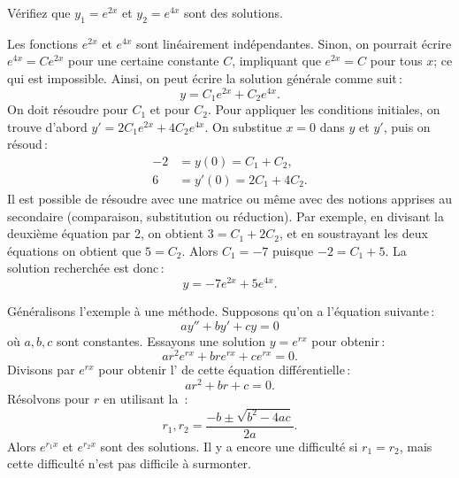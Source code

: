 \begin{exercise}
Vérifiez que $y_1= e^{2x}$ et $y_2= e^{4x}$ sont des solutions.
\end{exercise}

Les fonctions  $e^{2x}$ et $e^{4x}$ sont linéairement indépendantes. Sinon, on pourrait  écrire  $e^{4x} = C e^{2x}$ pour une certaine constante $C$,
impliquant que $e^{2x} = C$ pour tous $x$; ce qui est impossible. 
Ainsi, on peut écrire la solution générale comme suit\,:
\begin{equation*}
y = C_1 e^{2x} + C_2 e^{4x} .
\end{equation*}
On doit résoudre pour $C_1$ et pour $C_2$.  Pour appliquer les conditions initiales,
on trouve d'abord $y' = 2 C_1 e^{2x} + 4 C_2 e^{4x}$.  On substitue $x=0$ dans
$y$ et $y'$, puis on résoud\,: 
\begin{align*}
-2 & = y(0) = C_1 + C_2 , \\
6 & = y'(0) = 2 C_1 + 4 C_2 .
\end{align*}
Il est possible de résoudre avec une matrice ou même avec des notions apprises au secondaire (comparaison, substitution ou réduction). Par exemple, en divisant la deuxième équation par 2, on obtient $3 = C_1 + 2 C_2$, et en soustrayant les deux équations on obtient que $5 = C_2$.  Alors $C_1 = -7$ puisque $-2 = C_1 + 5$.  La solution recherchée est donc\,:
\begin{equation*}
y = -7 e^{2x} + 5 e^{4x} .
\end{equation*}

\medskip

Généralisons l'exemple à une méthode. Supposons qu'on a l'équation suivante\,:
\begin{equation} \label{ccsol:eq}
a y'' + b y' + c y = 0 
\end{equation}
où $a, b, c$ sont constantes.  Essayons une solution  $y = e^{rx}$ pour obtenir\,:   
\begin{equation*}
a r^2 e^{rx} + 
b r e^{rx} + 
c e^{rx} = 0 .
\end{equation*}
Divisons par  $e^{rx}$ pour obtenir  
l'\emph{} de cette équation différentielle\,:
\begin{equation*}
a r^2 + 
b r + 
c = 0 .
\end{equation*}
Résolvons pour $r$ en utilisant la  \,: 
\begin{equation*}
r_1, r_2 = \frac{-b \pm \sqrt{b^2 - 4ac}}{2a} .
\end{equation*}
Alors $e^{r_1 x}$ et $e^{r_2 x}$ sont des solutions.  Il y a encore une difficulté si $r_1 = r_2$, mais cette difficulté n'est pas difficile à surmonter.  

